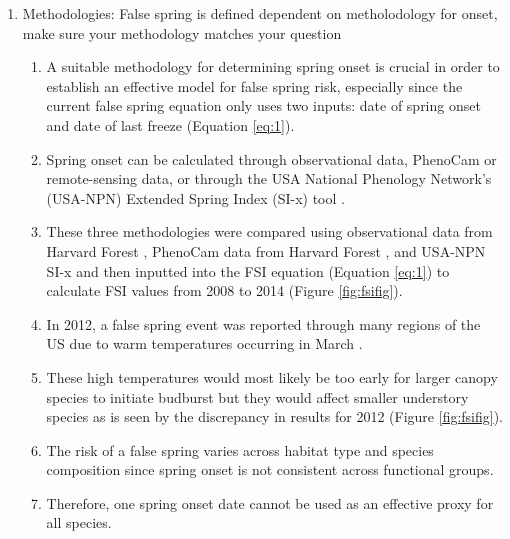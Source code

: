 \documentclass{article}\usepackage[]{graphicx}\usepackage[]{color}
\begin{document}
\begin{enumerate}
\item Methodologies: False spring is defined dependent on metholodology for onset, make sure your methodology matches your question 
\begin{enumerate}
\item A suitable methodology for determining spring onset is crucial in order to establish an effective model for false spring risk, especially since the current false spring equation only uses two inputs: date of spring onset and date of last freeze (Equation \ref{eq:1}). 
\item Spring onset can be calculated through observational data, PhenoCam or remote-sensing data, or through the USA National Phenology Network's (USA-NPN) Extended Spring Index (SI-x) tool \citep{USA-NPN2016}.
\item These three methodologies were compared using observational data from Harvard Forest \citep{Okeefe2014}, PhenoCam data from Harvard Forest \citep{Richardson2015}, and USA-NPN SI-x \citep{USA-NPN2016} and then inputted into the FSI equation (Equation \ref{eq:1}) to calculate FSI values from 2008 to 2014 (Figure \ref{fig:fsifig}).
\item In 2012, a false spring event was reported through many regions of the US due to warm temperatures occurring in March \citep{Ault2015}.
\item These high temperatures would most likely be too early for larger canopy species to initiate budburst but they would affect smaller understory species as is seen by the discrepancy in results for 2012 (Figure \ref{fig:fsifig}).
\item The risk of a false spring varies across habitat type and species composition since spring onset is not consistent across functional groups.
\item Therefore, one spring onset date cannot be used as an effective proxy for all species. %
\end{enumerate}


\end{enumerate}
\end{document}
